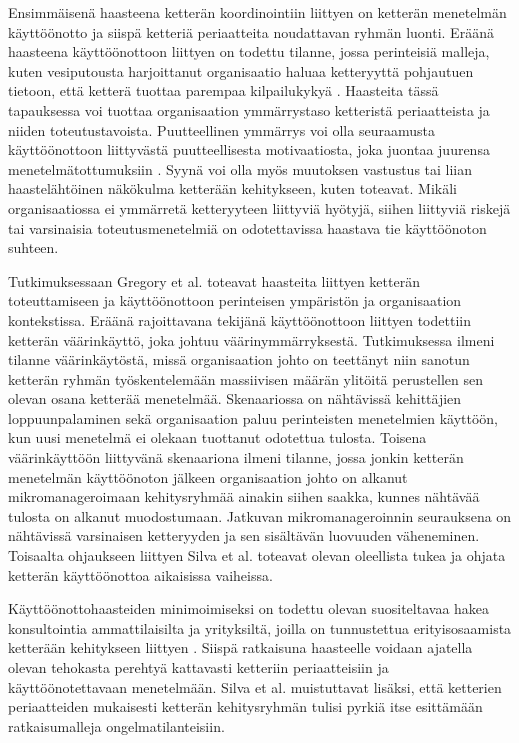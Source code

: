 Ensimmäisenä haasteena ketterän koordinointiin liittyen on ketterän menetelmän käyttöönotto ja siispä ketteriä periaatteita noudattavan ryhmän luonti. Eräänä haasteena käyttöönottoon liittyen on todettu tilanne, jossa perinteisiä malleja, kuten vesiputousta harjoittanut organisaatio haluaa ketteryyttä pohjautuen tietoon, että ketterä tuottaa parempaa kilpailukykyä \cite{MCKNIGHT2014168}. Haasteita tässä tapauksessa voi tuottaa organisaation ymmärrystaso ketteristä periaatteista ja niiden toteutustavoista. Puutteellinen ymmärrys voi olla seuraamusta käyttöönottoon liittyvästä puutteellisesta motivaatiosta, joka juontaa juurensa menetelmätottumuksiin \cite{GREGORY201692}. Syynä voi olla myös muutoksen vastustus tai liian haastelähtöinen näkökulma ketterään kehitykseen, kuten \cite{SELLERISILVA201520} toteavat. Mikäli organisaatiossa ei ymmärretä ketteryyteen liittyviä hyötyjä, siihen liittyviä riskejä tai varsinaisia toteutusmenetelmiä on odotettavissa haastava tie käyttöönoton suhteen.

Tutkimuksessaan Gregory et al. \cite{GREGORY201692} toteavat haasteita liittyen ketterän toteuttamiseen ja käyttöönottoon perinteisen ympäristön ja organisaation kontekstissa. Eräänä rajoittavana tekijänä käyttöönottoon liittyen todettiin ketterän väärinkäyttö, joka johtuu väärinymmärryksestä. Tutkimuksessa ilmeni tilanne väärinkäytöstä, missä organisaation johto on teettänyt niin sanotun ketterän ryhmän työskentelemään massiivisen määrän ylitöitä perustellen sen olevan osana ketterää menetelmää. Skenaariossa on nähtävissä kehittäjien loppuunpalaminen sekä organisaation paluu perinteisten menetelmien käyttöön, kun uusi menetelmä ei olekaan tuottanut odotettua tulosta. Toisena väärinkäyttöön liittyvänä skenaariona ilmeni tilanne, jossa jonkin ketterän menetelmän käyttöönoton jälkeen organisaation johto on alkanut mikromanageroimaan kehitysryhmää ainakin siihen saakka, kunnes nähtävää tulosta on alkanut muodostumaan. Jatkuvan mikromanageroinnin seurauksena on nähtävissä varsinaisen ketteryyden ja sen sisältävän luovuuden väheneminen. Toisaalta ohjaukseen liittyen Silva et al. \cite{SELLERISILVA201520} toteavat olevan oleellista tukea ja ohjata ketterän käyttöönottoa aikaisissa vaiheissa.

Käyttöönottohaasteiden minimoimiseksi on todettu olevan suositeltavaa hakea konsultointia ammattilaisilta ja yrityksiltä, joilla on tunnustettua erityisosaamista ketterään kehitykseen liittyen \cite{SELLERISILVA201520}. Siispä ratkaisuna haasteelle voidaan ajatella olevan tehokasta perehtyä kattavasti ketteriin periaatteisiin ja käyttöönotettavaan menetelmään. Silva et al. \cite{SELLERISILVA201520} muistuttavat lisäksi, että ketterien periaatteiden mukaisesti ketterän kehitysryhmän tulisi pyrkiä itse esittämään ratkaisumalleja ongelmatilanteisiin.

